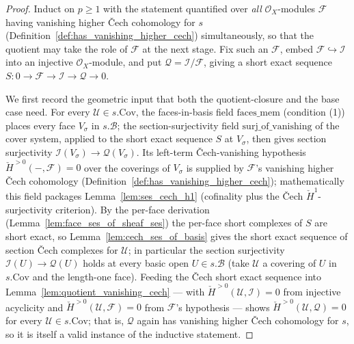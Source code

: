 \begin{proof}
  Induct on \(p \ge 1\) with the statement quantified over \emph{all} \(\mathcal{O}_X\)-modules
  \(\mathcal{F}\) having vanishing higher {\v C}ech cohomology for \(s\)
  (Definition~\ref{def:has_vanishing_higher_cech}) simultaneously, so that the quotient may take the
  role of \(\mathcal{F}\) at the next stage. Fix such an \(\mathcal{F}\), embed
  \(\mathcal{F} \hookrightarrow \mathcal{I}\) into an injective \(\mathcal{O}_X\)-module, and put
  \(\mathcal{Q} = \mathcal{I}/\mathcal{F}\), giving a short exact sequence \(S : 0 \to \mathcal{F}
  \to \mathcal{I} \to \mathcal{Q} \to 0\).

  We first record the geometric input that both the quotient-closure and the base case need. For
  every \(\mathcal{U} \in s.\mathrm{Cov}\), the faces-in-basis field \(\mathrm{faces\_mem}\) (condition
  (1)) places every face \(V_\sigma\) in \(s.\mathcal{B}\); the section-surjectivity field
  \(\mathrm{surj\_of\_vanishing}\) of the cover system, applied to the short exact sequence \(S\) at
  \(V_\sigma\), then gives section surjectivity \(\mathcal{I}(V_\sigma) \to \mathcal{Q}(V_\sigma)\).
  Its left-term {\v C}ech-vanishing hypothesis \(\check{H}^{>0}(-,\mathcal{F}) = 0\) over the coverings
  of \(V_\sigma\) is supplied by \(\mathcal{F}\)'s vanishing higher {\v C}ech cohomology
  (Definition~\ref{def:has_vanishing_higher_cech}); mathematically this field packages
  Lemma~\ref{lem:ses_cech_h1} (cofinality plus the {\v C}ech \(\check{H}^1\)-surjectivity criterion).
  By the per-face derivation
  (Lemma~\ref{lem:face_ses_of_sheaf_ses}) the per-face short complexes of \(S\) are short exact, so
  Lemma~\ref{lem:cech_ses_of_basis} gives the short exact sequence of section {\v C}ech complexes for
  \(\mathcal{U}\); in particular the section surjectivity \(\mathcal{I}(U) \to \mathcal{Q}(U)\) holds
  at every basic open \(U \in s.\mathcal{B}\) (take \(\mathcal{U}\) a covering of \(U\) in
  \(s.\mathrm{Cov}\) and the length-one face). Feeding the {\v C}ech short exact sequence into
  Lemma~\ref{lem:quotient_vanishing_cech} — with \(\check{H}^{>0}(\mathcal{U}, \mathcal{I}) = 0\)
  from injective acyclicity and \(\check{H}^{>0}(\mathcal{U}, \mathcal{F}) = 0\) from
  \(\mathcal{F}\)'s hypothesis — shows \(\check{H}^{>0}(\mathcal{U}, \mathcal{Q}) = 0\) for every
  \(\mathcal{U} \in s.\mathrm{Cov}\); that is, \(\mathcal{Q}\) again has vanishing higher {\v C}ech
  cohomology for \(s\), so it is itself a valid instance of the inductive statement.


\end{proof}

